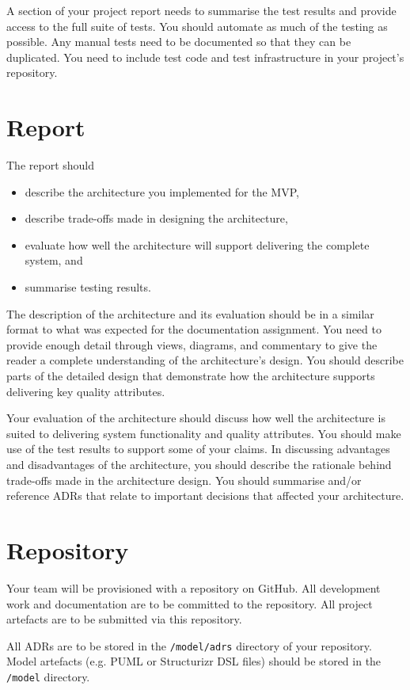 \documentclass{csse4400}
\begin{document}
A section of your project report needs to summarise the test results and provide access to the full suite of tests.
You should automate as much of the testing as possible.
Any manual tests need to be documented so that they can be duplicated.
You need to include test code and test infrastructure in your project's repository.


\section{Report}
The report should
\begin{itemize}
    \item describe the architecture you implemented for the MVP,
    \item describe trade-offs made in designing the architecture,
    \item evaluate how well the architecture will support delivering the complete system, and
    \item summarise testing results.
\end{itemize}

The description of the architecture and its evaluation should be in a similar format to what was expected for the documentation assignment.
You need to provide enough detail through views, diagrams, and commentary to give the reader a complete understanding of the architecture's design.
You should describe parts of the detailed design that demonstrate how the architecture supports delivering key quality attributes.

Your evaluation of the architecture should discuss how well the architecture is suited to delivering system functionality and quality attributes.
You should make use of the test results to support some of your claims.
In discussing advantages and disadvantages of the architecture, you should describe the rationale behind trade-offs made in the architecture design.
You should summarise and/or reference ADRs that relate to important decisions that affected your architecture.


\section{Repository}
Your team will be provisioned with a repository on GitHub.
All development work and documentation are to be committed to the repository.
All project artefacts are to be submitted via this repository.

All ADRs are to be stored in the \texttt{/model/adrs} directory of your repository.
Model artefacts (e.g. PUML or Structurizr DSL files) should be stored in the \texttt{/model} directory.
\end{document}
